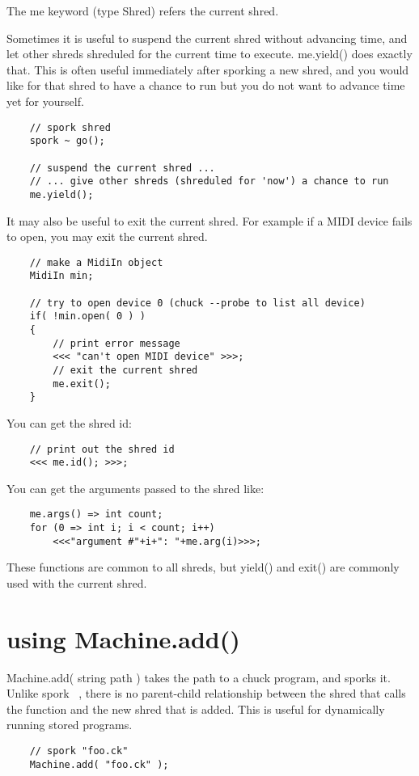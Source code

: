 The me keyword (type Shred) refers the current shred.

Sometimes it is useful to suspend the current shred without advancing time, and let other shreds shreduled for the current time to execute.  me.yield() does exactly that. This is often useful immediately after sporking a new shred, and you would like for that shred to have a chance to run but you do not want to advance time yet for yourself.
\begin{verbatim}
    // spork shred
    spork ~ go();

    // suspend the current shred ...
    // ... give other shreds (shreduled for 'now') a chance to run
    me.yield();
\end{verbatim}

It may also be useful to exit the current shred. For example if a MIDI device fails to open, you may exit the current shred.
\begin{verbatim}
    // make a MidiIn object
    MidiIn min;

    // try to open device 0 (chuck --probe to list all device)
    if( !min.open( 0 ) )
    {
        // print error message
        <<< "can't open MIDI device" >>>;
        // exit the current shred
        me.exit();
    }
\end{verbatim}

You can get the shred id:
\begin{verbatim}
    // print out the shred id
    <<< me.id(); >>>;
\end{verbatim}

You can get the arguments passed to the shred like:
\begin{verbatim}
    me.args() => int count;
    for (0 => int i; i < count; i++)
        <<<"argument #"+i+": "+me.arg(i)>>>;
\end{verbatim}

These functions are common to all shreds, but yield() and exit() are commonly used with the current shred.
 
\section{using Machine.add()}

Machine.add( string path ) takes the path to a chuck program, and sporks it. Unlike spork ~, there is no parent-child relationship between the shred that calls the function and the new shred that is added. This is useful for dynamically running stored programs.
\begin{verbatim}
    // spork "foo.ck"
    Machine.add( "foo.ck" );
\end{verbatim}

